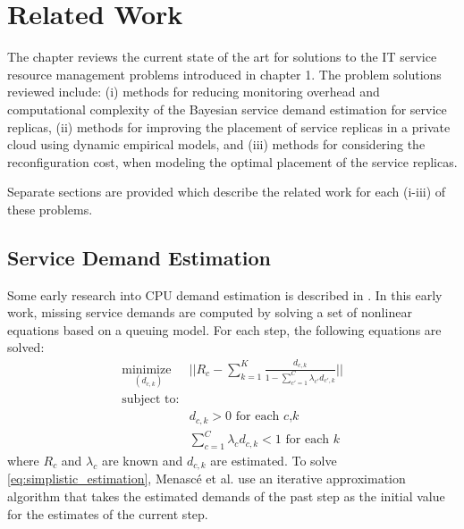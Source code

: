 

 \chapter{Related Work}      
\label{ch:state-of-art}    

The chapter reviews the current state of the art for solutions to the IT service resource management problems introduced in chapter 1.   
The problem solutions reviewed include:
   (i) methods for reducing monitoring overhead and computational complexity of the Bayesian service demand estimation for service replicas,
   (ii) methods for improving the placement of service replicas in a private cloud using dynamic empirical models, and 
   (iii) methods for considering the reconfiguration cost, when modeling the optimal placement of the service replicas.
 
   Separate sections are provided which describe the related work for each (i-iii) of these problems. 

 \section{Service Demand Estimation}   
\label{sec:service_demand_estimation} 

Some early research into CPU demand estimation is described in \cite{menasce2008computing}.
In this early work, missing service demands are computed by solving a set of nonlinear equations based on a queuing model. For each step, the following equations are solved:
 \begin{align}
 \underset{(d_{c,k})} {\text{minimize } }   & 
 || R_c-\sum_{k=1}^K \frac{d_{c,k}}{1-\sum_{c'=1}^C \lambda_{c'}d_{c',k}}||  \nonumber \\  %
 \text{subject to:}  \label{eq:simplistic_estimation} \\ 
 &  d_{c,k}>0  \text{  for each $c$,$k$} \nonumber \\ 
 & \sum_{c=1}^C \lambda_{c} d_{c,k} < 1 \text{  for each $k$} \nonumber
 \end{align}  
 where $R_c$ and $\lambda_c$ are known and $d_{c,k}$ are estimated.  
 To solve \ref{eq:simplistic_estimation}, Menasc{\'e} et al. use an iterative approximation algorithm that takes the estimated demands of the past step as the initial value for the estimates of the current step.

